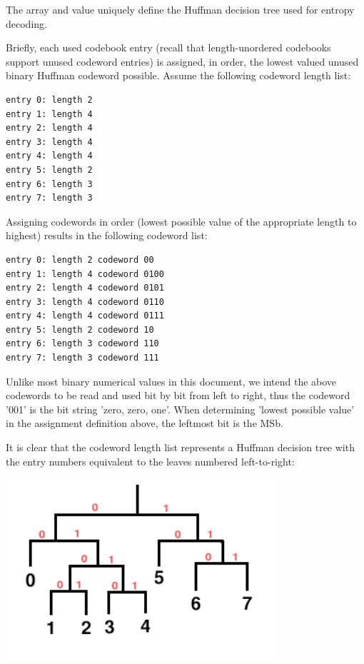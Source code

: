 The  array and
 value uniquely define the Huffman decision
tree used for entropy decoding.

Briefly, each used codebook entry (recall that length-unordered
codebooks support unused codeword entries) is assigned, in order, the
lowest valued unused binary Huffman codeword possible.  Assume the
following codeword length list:

\begin{Verbatim}[commandchars=\\\{\}]
entry 0: length 2
entry 1: length 4
entry 2: length 4
entry 3: length 4
entry 4: length 4
entry 5: length 2
entry 6: length 3
entry 7: length 3
\end{Verbatim}

Assigning codewords in order (lowest possible value of the appropriate
length to highest) results in the following codeword list:

\begin{Verbatim}[commandchars=\\\{\}]
entry 0: length 2 codeword 00
entry 1: length 4 codeword 0100
entry 2: length 4 codeword 0101
entry 3: length 4 codeword 0110
entry 4: length 4 codeword 0111
entry 5: length 2 codeword 10
entry 6: length 3 codeword 110
entry 7: length 3 codeword 111
\end{Verbatim}


\begin{note}
Unlike most binary numerical values in this document, we
intend the above codewords to be read and used bit by bit from left to
right, thus the codeword '001' is the bit string 'zero, zero, one'.
When determining 'lowest possible value' in the assignment definition
above, the leftmost bit is the MSb.
\end{note}

It is clear that the codeword length list represents a Huffman
decision tree with the entry numbers equivalent to the leaves numbered
left-to-right:

\begin{center}
\includegraphics[width=10cm]{hufftree}
\end{center}


